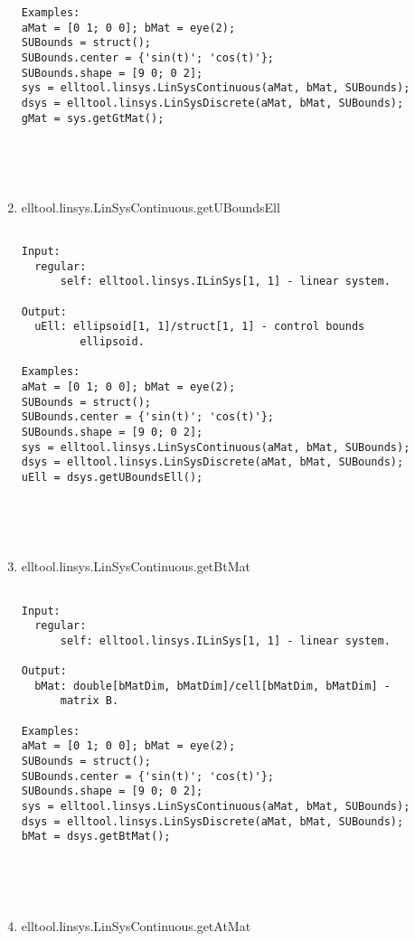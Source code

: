 \begin{enumerate}
\begin{lstlisting}
Examples:
aMat = [0 1; 0 0]; bMat = eye(2);
SUBounds = struct();
SUBounds.center = {'sin(t)'; 'cos(t)'};
SUBounds.shape = [9 0; 0 2];
sys = elltool.linsys.LinSysContinuous(aMat, bMat, SUBounds);
dsys = elltool.linsys.LinSysDiscrete(aMat, bMat, SUBounds);
gMat = sys.getGtMat();





\end{lstlisting}
\fontfamily{\familydefault}
\selectfont
\item {elltool.linsys.LinSysContinuous.getUBoundsEll}
\selectfont
\begin{lstlisting}

Input:
  regular:
      self: elltool.linsys.ILinSys[1, 1] - linear system.

Output:
  uEll: ellipsoid[1, 1]/struct[1, 1] - control bounds
         ellipsoid.

Examples:
aMat = [0 1; 0 0]; bMat = eye(2);
SUBounds = struct();
SUBounds.center = {'sin(t)'; 'cos(t)'};
SUBounds.shape = [9 0; 0 2];
sys = elltool.linsys.LinSysContinuous(aMat, bMat, SUBounds);
dsys = elltool.linsys.LinSysDiscrete(aMat, bMat, SUBounds);
uEll = dsys.getUBoundsEll();





\end{lstlisting}
\fontfamily{\familydefault}
\selectfont
\item {elltool.linsys.LinSysContinuous.getBtMat}
\selectfont
\begin{lstlisting}

Input:
  regular:
      self: elltool.linsys.ILinSys[1, 1] - linear system.

Output:
  bMat: double[bMatDim, bMatDim]/cell[bMatDim, bMatDim] -
      matrix B.

Examples:
aMat = [0 1; 0 0]; bMat = eye(2);
SUBounds = struct();
SUBounds.center = {'sin(t)'; 'cos(t)'};
SUBounds.shape = [9 0; 0 2];
sys = elltool.linsys.LinSysContinuous(aMat, bMat, SUBounds);
dsys = elltool.linsys.LinSysDiscrete(aMat, bMat, SUBounds);
bMat = dsys.getBtMat();





\end{lstlisting}
\fontfamily{\familydefault}
\selectfont
\item {elltool.linsys.LinSysContinuous.getAtMat}
\selectfont
\begin{lstlisting}


\end{lstlisting}
\end{enumerate}
